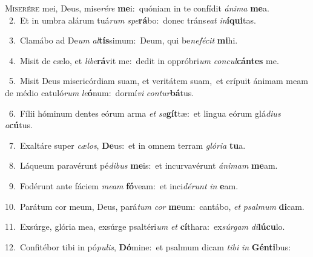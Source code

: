 \lettrine{\initial\textcolor{\initialcolor}{M}}{iserére} mei, Deus, mise\-\textit{ré}\-\textit{re} \textbf{me}\-i:~\star quóniam in te confídit \textit{á}\-\textit{ni}\textit{ma} \textbf{me}\-a.\\
{\numbfont\textcolor{\numbcolor}{~2.}}~Et in umbra alárum tuá\textit{rum} \textit{spe}\-\textbf{rá}bo:~\star donec tráns\-\textit{e}\-\textit{at} \textit{in}\-\textbf{í}\textbf{qui}tas.\par
{\numbfont\textcolor{\numbcolor}{~3.}}~Clamábo ad De\textit{um} \textit{al}\-\textbf{tís}simum:~\star Deum, qui be\-\textit{ne}\-\textit{fé}\textit{cit} \textbf{mi}\-hi.\par
{\numbfont\textcolor{\numbcolor}{~4.}}~Misit de cælo, et \textit{li}\-\textit{be}\textbf{rá}vit me:~\star dedit in oppróbri\textit{um} \textit{con}\-\textit{cul}\textbf{cán}\textbf{tes} me.\par
{\numbfont\textcolor{\numbcolor}{~5.}}~Misit Deus misericórdiam suam, et veritátem suam,~\dagger et erípuit ánimam meam de médio catuló\textit{rum} \textit{le}\-\textbf{ó}num:~\star dormí\textit{vi} \textit{con}\-\textit{tur}\textbf{bá}tus.\par
{\numbfont\textcolor{\numbcolor}{~6.}}~Fílii hóminum dentes eórum arma \textit{et} \textit{sa}\-\textbf{gít}tæ:~\star et lingua eórum glá\-\textit{di}\-\textit{us} \textit{a}\-\textbf{cú}tus.\par
{\numbfont\textcolor{\numbcolor}{~7.}}~Exaltáre super \textit{cæ}\-\textit{los}, \textbf{De}\-us:~\star et in omnem terram \textit{gló}\-\textit{ri}\textit{a} \textbf{tu}\-a.\par
{\numbfont\textcolor{\numbcolor}{~8.}}~Láqueum paravérunt pé\-\textit{di}\-\textit{bus} \textbf{me}\-is:~\star et incurvavérunt \textit{á}\-\textit{ni}\textit{mam} \textbf{me}\-am.\par
{\numbfont\textcolor{\numbcolor}{~9.}}~Fodérunt ante fáciem \textit{me}\-\textit{am} \textbf{fó}\-veam:~\star et inci\-\textit{dé}\-\textit{runt} \textit{in} \textbf{e}\-am.\par
{\numbfont\textcolor{\numbcolor}{10.}}~Parátum cor meum, Deus, pará\textit{tum} \textit{cor} \textbf{me}\-um:~\star cantábo, \textit{et} \textit{psal}\-\textit{mum} \textbf{di}\-cam.\par
{\numbfont\textcolor{\numbcolor}{11.}}~Exsúrge, glória mea, exsúrge psaltéri\textit{um} \textit{et} \textbf{cí}\-thara:~\star ex\-\textit{súr}\-\textit{gam} \textit{di}\-\textbf{lú}\textbf{cu}lo.\par
{\numbfont\textcolor{\numbcolor}{12.}}~Confitébor tibi in pó\-\textit{pu}\-\textit{lis}, \textbf{Dó}\-mine:~\star et psalmum dicam \textit{ti}\-\textit{bi} \textit{in} \textbf{Gén}\-\textbf{ti}bus:\par
